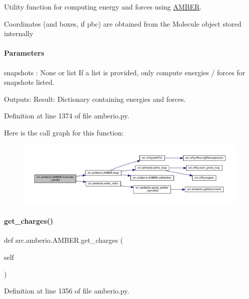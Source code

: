 Utility function for computing energy and forces using \hyperlink{classsrc_1_1amberio_1_1AMBER}{A\+M\+B\+ER}. 

Coordinates (and boxes, if pbc) are obtained from the Molecule object stored internally

\paragraph*{Parameters }

snapshots \+: None or list If a list is provided, only compute energies / forces for snapshots listed.

Outputs\+: Result\+: Dictionary containing energies and forces. 

Definition at line 1374 of file amberio.\+py.

Here is the call graph for this function\+:
\nopagebreak
\begin{figure}[H]
\begin{center}
\leavevmode
\includegraphics[width=350pt]{classsrc_1_1amberio_1_1AMBER_aaa5d9969b50621ec9288caf56d45c3d2_cgraph}
\end{center}
\end{figure}
\mbox{\label{classsrc_1_1amberio_1_1AMBER_a07b9d708ccb41ff3253f253a38aa0d8f}} 
\paragraph{\texorpdfstring{get\+\_\+charges()}{get\_charges()}}
{\footnotesize\ttfamily def src.\+amberio.\+A\+M\+B\+E\+R.\+get\+\_\+charges (\begin{DoxyParamCaption}\item[{}]{self }\end{DoxyParamCaption})}



Definition at line 1356 of file amberio.\+py.

